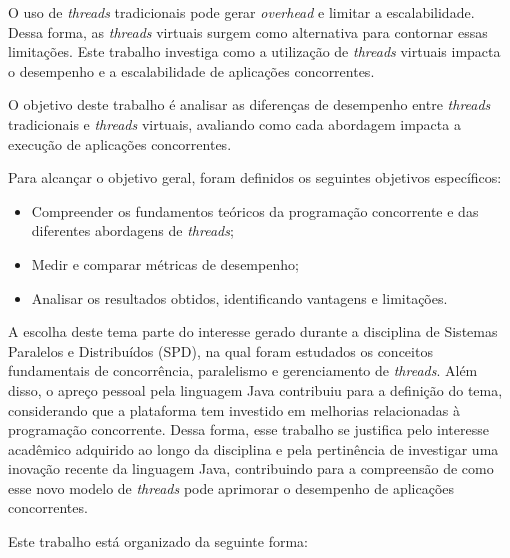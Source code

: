 \documentclass[12pt, openright, oneside, a4paper, english,	french,	spanish, brazil	]{abntex2}
\begin{document}
        O uso de \textit{threads} tradicionais pode gerar \textit{overhead} e limitar a escalabilidade. Dessa forma, as \textit{threads} virtuais surgem como alternativa para contornar essas limitações. Este trabalho investiga como a utilização de \textit{threads} virtuais impacta o desempenho e a escalabilidade de aplicações concorrentes.

        O objetivo deste trabalho é analisar as diferenças de desempenho entre \textit{threads} tradicionais e \textit{threads} virtuais, avaliando como cada abordagem impacta a execução de aplicações concorrentes.

        Para alcançar o objetivo geral, foram definidos os seguintes objetivos específicos:

        \begin{itemize}
            \item Compreender os fundamentos teóricos da programação concorrente e das diferentes abordagens de \textit{threads};
            \item Medir e comparar métricas de desempenho;
            \item Analisar os resultados obtidos, identificando vantagens e limitações.
        \end{itemize}

        A escolha deste tema parte do interesse gerado durante a disciplina de Sistemas Paralelos e Distribuídos (SPD), na qual foram estudados os conceitos fundamentais de concorrência, paralelismo e gerenciamento de \textit{threads}. Além disso, o apreço pessoal pela linguagem Java contribuiu para a definição do tema, considerando que a plataforma tem investido em melhorias relacionadas à programação concorrente. Dessa forma, esse trabalho se justifica pelo interesse acadêmico adquirido ao longo da disciplina e pela pertinência de investigar uma inovação recente da linguagem Java, contribuindo para a compreensão de como esse novo modelo de \textit{threads} pode aprimorar o desempenho de aplicações concorrentes.  
        
        Este trabalho está organizado da seguinte forma:
\end{document}
